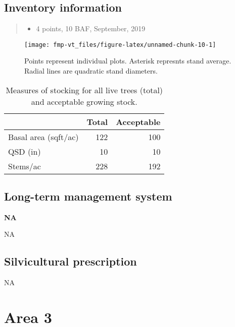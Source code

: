 \documentclass[]{tufte-handout}
\providecommand{\tightlist}{%
  \setlength{\itemsep}{0pt}\setlength{\parskip}{0pt}}
\begin{document}
\subsection{Inventory information}\label{inventory-information-1}

\begin{quote}
\begin{itemize}
\tightlist
\item
  4 points, 10 BAF, September, 2019
\end{itemize}
\end{quote}

\begin{figure}
\texttt{[image: fmp-vt\_files/figure-latex/unnamed-chunk-10-1]} \caption[Points represent individual plots]{Points represent individual plots. Asterisk represnts stand average. Radial lines are quadratic stand diameters.}\label{fig:unnamed-chunk-10}
\end{figure}

\begin{table}

\caption{\label{tab:unnamed-chunk-11}Measures of stocking for all live trees (total) and acceptable growing stock.}
\centering
\begin{tabular}[t]{lrr}
\toprule
  & Total & Acceptable\\
\midrule
Basal area (sqft/ac) & 122 & 100\\
QSD (in) & 10 & 10\\
Stems/ac & 228 & 192\\
\bottomrule
\end{tabular}
\end{table}

\subsection{Long-term management
system}\label{long-term-management-system-1}

\textbf{NA}

NA

\subsection{Silvicultural
prescription}\label{silvicultural-prescription-1}

NA

\newpage

\section{Area 3}\label{area-3}
\end{document}
